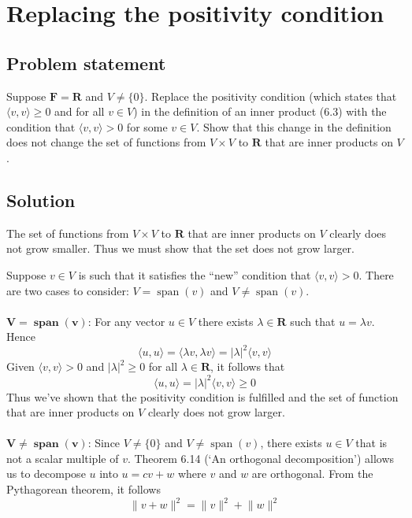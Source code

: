 \documentclass{article}
\providecommand{\abs}[1]{\lvert#1\rvert} \providecommand{\norm}[1]{\lVert#1\rVert}
\begin{document}
\clearpage

\section{Replacing the positivity condition}
\subsection*{Problem statement}
Suppose $\mathbf{F}=\mathbf{R}$ and $V\neq \{0\}$. 
Replace the positivity condition (which states that $\langle v, v\rangle\geq 0$ and for all $v\in V$) in the definition of an inner product (6.3) with the condition that $\langle v, v\rangle > 0$ for some $v\in V$. 
Show that this change in the definition does not change the set of functions from $V\times V$ to $\mathbf{R}$ that are inner products on $V$.

\subsection*{Solution}
The set of functions from $V\times V$ to $\mathbf{R}$ that are inner products on $V$ clearly does not grow smaller. 
Thus we must show that the set does not grow larger.

Suppose $v\in V$ is such that it satisfies the ``new'' condition that $\langle v, v\rangle > 0$. 
There are two cases to consider: $V=\operatorname{span}(v)$ and $V\neq\operatorname{span}(v)$.
\\
\\
$\mathbf{{V=\operatorname{\textbf{span}}(v)}}$: For any vector $u\in V$ there exists $\lambda\in\mathbf{R}$ such that $u=\lambda v$. 
Hence 
\[\langle u, u\rangle =\langle \lambda v, \lambda v \rangle = \abs{\lambda}^2\langle v, v\rangle \]
Given $\langle v, v\rangle > 0$ and $|\lambda|^2\geq 0$ for all $\lambda\in\mathbf{R}$, it follows that 
\[\langle u, u\rangle = |\lambda|^2\langle v, v\rangle \geq 0\]
Thus we've shown that the positivity condition is fulfilled and the set of function that are inner products on $V$ clearly does not grow larger.
\\
\\
$\mathbf{V\neq\operatorname{\textbf{span}}(v)}$: Since $V\neq \{0\}$ and $V\neq\operatorname{span}(v)$, there exists $u\in V$ that is not a scalar multiple of $v$. 
Theorem 6.14 (`An orthogonal decomposition') allows us to decompose $u$ into $u=cv+w$ where $v$ and $w$ are orthogonal. 
From the Pythagorean theorem, it follows
\[\norm{v+w}^2=\norm{v}^2+\norm{w}^2\]
\end{document}
